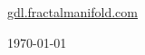 \begin{titlepage}
  \centering
  \vspace*{3cm}

  {\Huge\bfseries \booktitle\par}
  \vspace{0.4cm}
  {\Large\itshape \booksubtitle\par}
  \vspace{0.6cm}
  {\large \booktagline\par}

  \vfill

  {\Large \bookauthor\par}
  \vspace{1cm}
  {\large \href{https://gdl.fractalmanifold.com}{gdl.fractalmanifold.com}\par}

  \vspace{1cm}
  {\large \today\par}
\end{titlepage}
